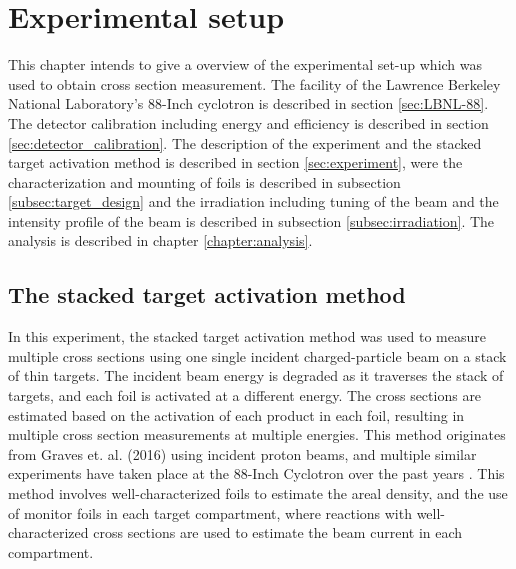 \chapter{Experimental setup}
This chapter intends to give a overview of the experimental set-up which was used to obtain cross section measurement. The facility of the Lawrence Berkeley National Laboratory's 88-Inch cyclotron is described in section \ref{sec:LBNL-88}. The detector calibration including energy and efficiency is described in section \ref{sec:detector_calibration}. The description of the experiment and the stacked target activation method is described in section \ref{sec:experiment}, were the characterization and mounting of foils is described in subsection \ref{subsec:target_design} and the irradiation including tuning of the beam and the intensity profile of the beam is described in subsection \ref{subsec:irradiation}. The analysis is described in chapter \ref{chapter:analysis}. 


\section{The stacked target activation method}
In this experiment, the stacked target activation method was used to measure multiple cross sections using one single incident charged-particle beam on a stack of thin targets. The incident beam energy is degraded as it traverses the stack of targets, and each foil is activated at a different energy. The cross sections are estimated based on the activation of each product in each foil, resulting in multiple cross section measurements at multiple energies. This method originates from Graves et. al. (2016) \cite{Graves2016} using incident proton beams, and multiple similar experiments have taken place at the 88-Inch Cyclotron over the past years \cite{Voyles2019, Morrell2020, Voyles2018c}. This method involves well-characterized foils to estimate the areal density, and the use of monitor foils in each target compartment, where reactions with well-characterized cross sections are used to estimate the beam current in each compartment.   \\ 


